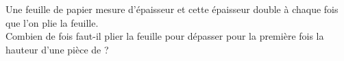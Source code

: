 \begin{exercice*}
   Une feuille de papier mesure  d'épaisseur et cette épaisseur double à chaque fois que l'on plie la feuille. \\
   Combien de fois faut-il plier la feuille pour dépasser pour la première fois la hauteur d'une pièce de  ?
\end{exercice*}
 